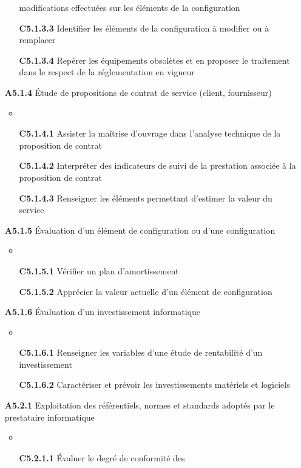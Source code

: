 \documentclass[12pt,a4paper,oneside,titlepage,final]{article}
\begin{document}
\begin{enumerate}
\begin{itemize}
    modifications effectuées sur les éléments de la configuration
    \item [\textbf{C5.1.3.3}] Identifier les éléments de la
    configuration à modifier ou à remplacer
    \item [\textbf{C5.1.3.4}] Repérer les équipements obsolètes et en
    proposer le traitement dans le respect de la réglementation en
    vigueur
  \end{itemize}
  \item [\textbf{A5.1.4}] Étude de propositions de contrat de service
  (client, fournisseur)
  \begin{itemize}
    \item \item [\textbf{C5.1.4.1}] Assister la maîtrise d'ouvrage
    dans l'analyse technique de la proposition de contrat
    \item [\textbf{C5.1.4.2}] Interpréter des indicateurs de suivi de
    la prestation associée à la proposition de contrat
    \item [\textbf{C5.1.4.3}] Renseigner les éléments permettant
    d'estimer la valeur du service
  \end{itemize}
  \item [\textbf{A5.1.5}] Évaluation d'un élément de configuration ou
  d'une configuration
  \begin{itemize}
    \item \item [\textbf{C5.1.5.1}] Vérifier un plan d'amortissement
    \item [\textbf{C5.1.5.2}] Apprécier la valeur actuelle d'un
    élément de configuration
  \end{itemize}
  \item [\textbf{A5.1.6}] Évaluation d'un investissement informatique
  \begin{itemize}
    \item \item [\textbf{C5.1.6.1}] Renseigner les variables d'une
    étude de rentabilité d'un investissement
    \item [\textbf{C5.1.6.2}] Caractériser et prévoir les
    investissements matériels et logiciels
  \end{itemize}
  \item [\textbf{A5.2.1}] Exploitation des référentiels, normes et
  standards adoptés par le prestataire informatique
  \begin{itemize}
    \item \item [\textbf{C5.2.1.1}] Évaluer le degré de conformité des

\end{itemize}
\end{enumerate}
\end{document}

